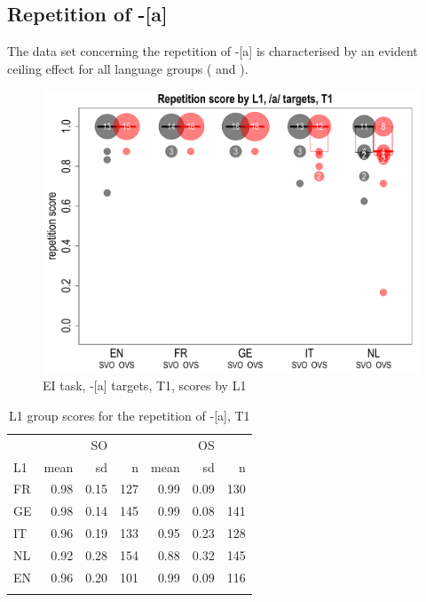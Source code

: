 \subsection{Repetition of -[a]}\label{sec:04:2.5}

The data set concerning the repetition of -[a] is characterised by an evident ceiling effect for all language groups ( and ).

\begin{figure}
    \includegraphics[width=.9\textwidth]{figures/04-6.pdf}
    \caption{EI task, -[a] targets, T1, scores by L1}
    \label{fig:04:6}
\end{figure}

\begin{table}
    \begin{tabularx}{.66\textwidth}{Xrrr@{\hspace{1cm}}rrr}
    \lsptoprule
    & &{SO}& & &{OS}&\\
    L1 & mean & sd & n & mean & sd & n\\
    \midrule
    FR & 0.98 & 0.15 & 127 & 0.99 & 0.09 & 130\\
    GE & 0.98 & 0.14 & 145 & 0.99 & 0.08 & 141\\
    IT & 0.96 & 0.19 & 133 & 0.95 & 0.23 & 128\\
    NL & 0.92 & 0.28 & 154 & 0.88 & 0.32 & 145\\
    EN & 0.96 & 0.20 & 101 & 0.99 & 0.09 & 116\\
    \lspbottomrule
    \end{tabularx}
    \caption{L1 group scores for the repetition of -[a], T1}
    \label{tab:04:7}
\end{table}

